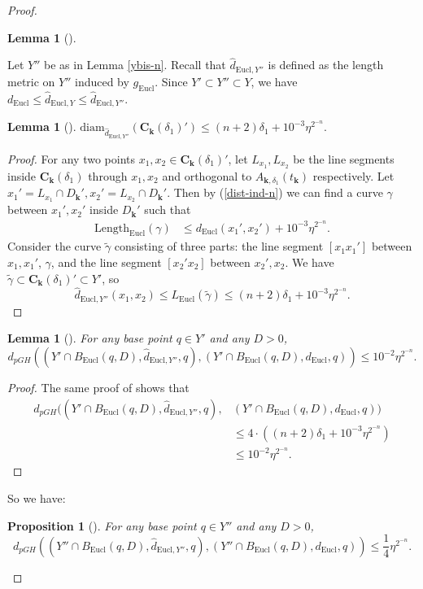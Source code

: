 \documentclass[letter]{amsart}
\newtheorem{lem}[thm]{Lemma}
\newtheorem{prop}[thm]{Proposition}
\theoremstyle{definition}
\theoremstyle{remark}
\def\diam{\mathrm{diam}}
\def\Length{\mathrm{Length}}
\begin{document}
\begin{proof}
\begin{lem}[{\cite[Lemma 4.5]{DS'23}}]
\end{lem}

Let $Y''$ be as in Lemma \ref{ybis-n}.
Recall that $\hat{d}_{\mathrm{Eucl},Y''}$ is defined as the length metric on $Y''$ induced by $g_{\mathrm{Eucl}}$. Since $Y' \subset Y'' \subset Y$, we have $d_{\mathrm{Eucl}} \leq \hat{d}_{\mathrm{Eucl},Y} \leq \hat{d}_{\mathrm{Eucl},Y''}$. 

\begin{lem}[{\cite[Lemma 4.6]{DS'23}}]\label{local small diam-n}
	$\diam_{\hat{d}_{\mathrm{Eucl}, Y''}}(\mathbf{C}_{\mathbf{k}}(\delta _1)' ) \leq (n+2) \delta _1 + 10^{-3}\eta ^{2^{-n}}.$
\end{lem}
\begin{proof}
	For any two points $x_1, x_2 \in \mathbf{C}_{\mathbf{k}}(\delta _1)'$, let $L_{x_1}, L_{x_2}$ be the line segments inside $\mathbf{C}_{\mathbf{k}}(\delta _1)$ through $x_1, x_2$ and orthogonal to $A_{\mathbf{k},\delta _1}(t_{\mathbf{k}})$ respectively. Let $x_1' = L_{x_1}\cap D_{\mathbf{k}}', x_2' = L_{x_2}\cap  D_{\mathbf{k}}'$. Then 
	by (\ref{dist-ind-n})
	we can find a curve $\gamma $ between $x_1', x_2'$ inside $D_{\mathbf{k}}'$ such that 
\begin{align*}
	\Length_{\mathrm{Eucl}}(\gamma ) &\leq d_{\mathrm{Eucl}}(x_1', x_2') + 10 ^{-3} \eta ^{2^{-n}}.
\end{align*}
	Consider the curve $\tilde{\gamma }$ consisting of three parts: the line segment $[x_1x_1']$ between $x_1, x_1'$, $\gamma $, and the line segment $[x_2'x_2]$ between $x_2', x_2$. We have $\tilde{\gamma } \subset \mathbf{C}_{\mathbf{k}}(\delta _1)' \subset Y'$, so
	$$
	\hat{d}_{\mathrm{Eucl}, Y''}(x_1, x_2) \leq L_{\mathrm{Eucl}}(\tilde{\gamma }) \leq (n+2) \delta _1 + 10^{-3}\eta ^{2^{-n}}.
	$$ 
\end{proof}



\begin{lem}[{\cite[Lemma 4.7]{DS'23}}] \label{ajout-n}
	For any base point $q \in Y'$ and any $D>0$,
	$$
	d_{pGH}( (Y' \cap B_{\mathrm{Eucl}}(q, D), \hat{d}_{\mathrm{Eucl},Y''},q), (Y' \cap B_{\mathrm{Eucl}}(q, D), d_{\mathrm{Eucl}},q) ) \leq 10^{-2}\eta ^{2^{-n}}.
$$ 
\end{lem}
\begin{proof}
	The same proof of \cite[Lemma 4.7]{DS'23} shows that  
	\begin{align*}
		d_{pGH}( (Y' \cap B_{\mathrm{Eucl}}(q, D), \hat{d}_{\mathrm{Eucl},Y''},q),& (Y' \cap B_{\mathrm{Eucl}}(q, D), d_{\mathrm{Eucl}},q) )\\
		&\leq 4 \cdot ( (n+2) \delta _1 + 10^{-3} \eta ^{2^{-n}} )\\
		&\leq 10^{-2}\eta ^{2^{-n}}.
	\end{align*}
\end{proof}
So we have:
\begin{prop}[{\cite[Proposition 4.8]{DS'23}}]\label{Y'-GH}
For any base point $q \in Y''$ and any $D>0$,
	$$
	d_{pGH}( (Y'' \cap B_{\mathrm{Eucl}}(q, D), \hat{d}_{\mathrm{Eucl},Y''},q), (Y''\cap B_{\mathrm{Eucl}}(q,D) , d_{\mathrm{Eucl}},q) ) \leq \frac{1}{4}\eta ^{2^{-n}}.
	$$ 
\end{prop}


\end{proof}
\end{document}
